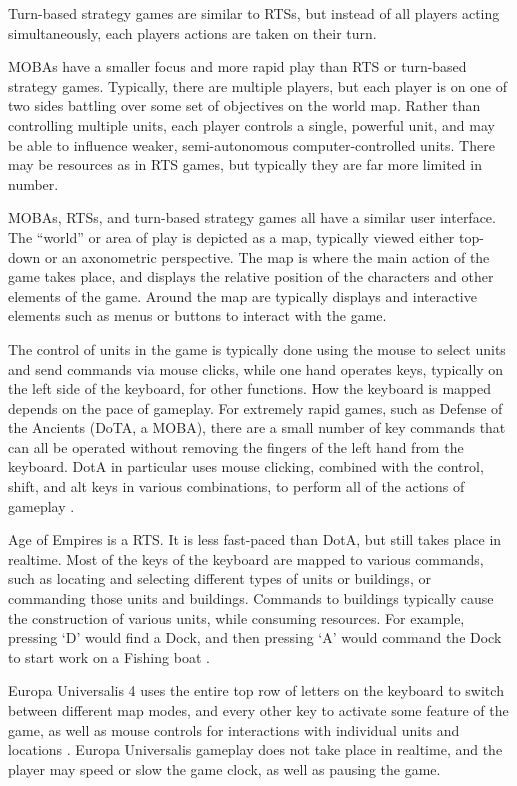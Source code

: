 Turn-based strategy games are similar to RTSs, but instead of all players acting simultaneously, each players actions are taken on their turn. 

MOBAs have a smaller focus and more rapid play than RTS or turn-based strategy games. 
Typically, there are multiple players, but each player is on one of two sides battling over some set of objectives on the world map. 
Rather than controlling multiple units, each player controls a single, powerful unit, and may be able to influence weaker, semi-autonomous computer-controlled units.  There may be resources as in RTS games, but typically they are far more limited in number.   

MOBAs, RTSs, and turn-based strategy games all have a similar user interface. 
The ``world'' or area of play is depicted as a map, typically viewed either top-down or an axonometric perspective. 
The map is where the main action of the game takes place, and displays the relative position of the characters and other elements of the game. 
Around the map are typically displays and interactive elements such as menus or buttons to interact with the game. 

The control of units in the game is typically done using the mouse to select units and send commands via mouse clicks, while one hand operates keys, typically on the left side of the keyboard, for other functions. 
How the keyboard is mapped depends on the pace of gameplay. 
For extremely rapid games, such as Defense of the Ancients (DoTA, a MOBA), there are a small number of key commands that can all be operated without removing the fingers of the left hand from the keyboard. 
DotA in particular uses mouse clicking, combined with the control, shift, and alt keys in various combinations, to perform all of the actions of gameplay . 

Age of Empires is a RTS. 
It is less fast-paced than DotA, but still takes place in realtime. 
Most of the keys of the keyboard are mapped to various commands, such as locating and selecting different types of units or buildings, or commanding those units and buildings. 
Commands to buildings typically cause the construction of various units, while consuming resources. 
For example, pressing `D' would find a Dock, and then pressing `A' would command the Dock to start work on a Fishing boat . 

Europa Universalis 4 uses the entire top row of letters on the keyboard to switch between different map modes, and every other key to activate some feature of the game, as well as mouse controls for interactions with individual units and locations . 
Europa Universalis gameplay does not take place in realtime, and the player may speed or slow the game clock, as well as pausing the game. 

